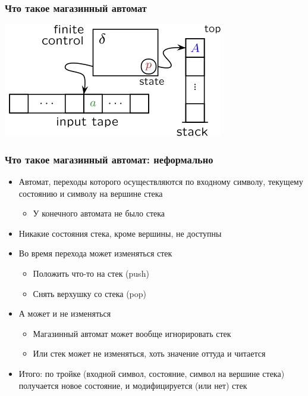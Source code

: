 \documentclass{beamer}
\begin{document}
\begin{frame}[fragile]
  \transwipe[direction=90]
  \frametitle{Что такое магазинный автомат}
\begin{center}
  \includegraphics[width=\textwidth]{pics/Pushdown.png}
\end{center} 

\end{frame}

\begin{frame}[fragile]
  \transwipe[direction=90]
  \frametitle{Что такое магазинный автомат: неформально}
\begin{itemize}
	\item Автомат, переходы которого осуществляются по входному символу, текущему состоянию и символу на вершине стека
	\begin{itemize}
		\item У конечного автомата не было стека
	\end{itemize}
	\item Никакие состояния стека, кроме вершины, не доступны
	\item Во время перехода может изменяться стек
	\begin{itemize}
		\item Положить что-то на стек (push)
		\item Снять верхушку со стека (pop)
	\end{itemize}
	\item А может и не изменяться
	\begin{itemize}
		\item Магазинный автомат может вообще игнорировать стек
		\item Или стек может не изменяться, хоть значение оттуда и читается
	\end{itemize}
	\item Итого: по тройке (входной символ, состояние, символ на вершине стека) получается новое состояние, и модифицируется (или нет) стек
\end{itemize}
\end{frame}
\end{document}
